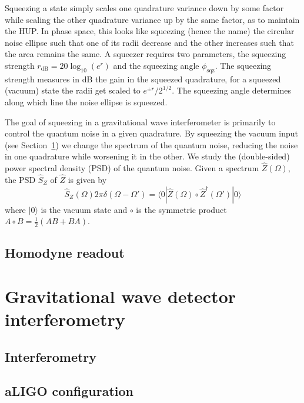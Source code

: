 \documentclass[aps,pra,superscriptaddress,reprint,nofootinbib]{revtex4-1}
\begin{document}
Squeezing a state simply scales one quadrature variance down by some factor while scaling the other quadrature variance up by the same factor, as to maintain the HUP. In phase space, this looks like squeezing (hence the name) the circular noise ellipse such that one of its radii decrease and the other increases such that the area remains the same. A squeezer requires two parameters, the squeezing strength $r_{\mathrm{dB}} = 20 \log_{10}(e^r)$ and the squeezing angle $\phi_{\mathrm{sqz}}$. The squeezing strength measures in dB the gain in the squeezed quadrature, for a squeezed (vacuum) state the radii get scaled to $e^{\pm r}/2^{1/2}$. The squeezing angle determines along which line the noise ellipse is squeezed.


The goal of squeezing in a gravitational wave interferometer is primarily to control the quantum noise in a given quadrature. By squeezing the vacuum input (see Section~\ref{sec:gwIFO}) we change the spectrum of the quantum noise, reducing the noise in one quadrature while worsening it in the other. We study the (double-sided) power spectral density (PSD) of the quantum noise. Given a spectrum $\hat{Z}(\Omega)$, the PSD $\hat{S}_Z$ of $\hat{Z}$ is given by $$\hat{S}_Z(\Omega) 2 \pi \delta(\Omega - \Omega') = \langle0| \hat{Z}(\Omega) \circ \hat{Z}^\dagger(\Omega') |0\rangle$$ where $|0\rangle$ is the vacuum state and $\circ$ is the symmetric product $A \circ B = \frac{1}{2}(A B + B A)$.


\subsection{Homodyne readout}



\section{Gravitational wave detector interferometry}
\label{sec:gwIFO}

\subsection{Interferometry}

\subsection{aLIGO configuration}
\end{document}
